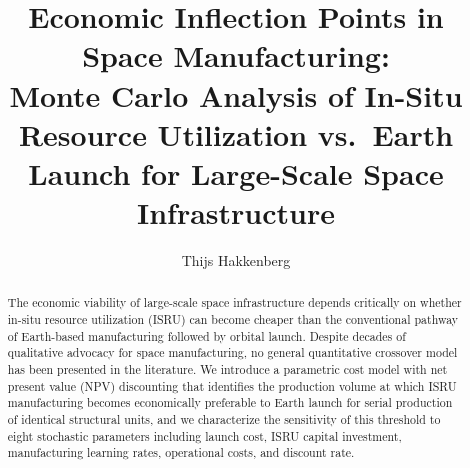 \documentclass[preprint,12pt]{elsarticle}
\begin{document}
\begin{frontmatter}

\title{Economic Inflection Points in Space Manufacturing:\\ Monte Carlo Analysis of In-Situ Resource Utilization vs.\ Earth Launch for Large-Scale Space Infrastructure}

\author[dyson]{Thijs Hakkenberg}

\address[dyson]{Project Dyson, Open Research Initiative}

\begin{abstract}
The economic viability of large-scale space infrastructure depends critically on whether in-situ resource utilization (ISRU) can become cheaper than the conventional pathway of Earth-based manufacturing followed by orbital launch. Despite decades of qualitative advocacy for space manufacturing, no general quantitative crossover model has been presented in the literature. We introduce a parametric cost model with net present value (NPV) discounting that identifies the production volume at which ISRU manufacturing becomes economically preferable to Earth launch for serial production of identical structural units, and we characterize the sensitivity of this threshold to eight stochastic parameters including launch cost, ISRU capital investment, manufacturing learning rates, operational costs, and discount rate.


\end{abstract}
\end{frontmatter}
\end{document}
